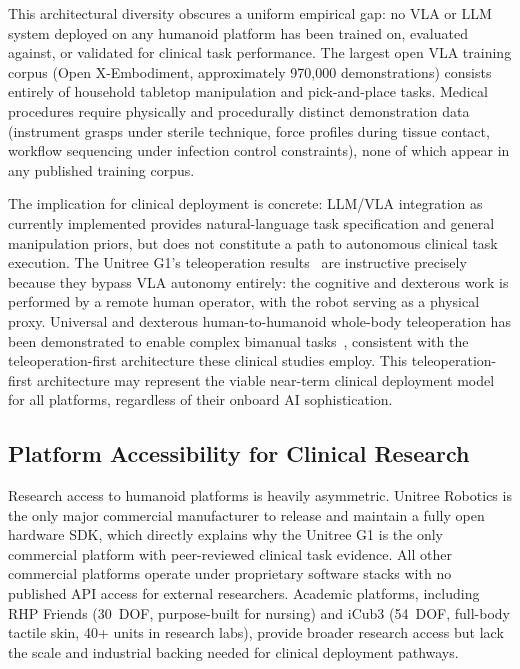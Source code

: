 \documentclass[acmjour]{acmart}
\begin{document}
This architectural diversity obscures a uniform empirical gap: no VLA or LLM
system deployed on any humanoid platform has been trained on, evaluated against,
or validated for clinical task performance. The largest open VLA training corpus
(Open X-Embodiment, approximately 970,000 demonstrations) consists entirely of
household tabletop manipulation and pick-and-place tasks. Medical procedures
require physically and procedurally distinct demonstration data (instrument
grasps under sterile technique, force profiles during tissue contact, workflow
sequencing under infection control constraints), none of which appear in any
published training corpus.

The implication for clinical deployment is concrete: LLM/VLA integration as
currently implemented provides natural-language task specification and general
manipulation priors, but does not constitute a path to autonomous clinical task
execution. The Unitree G1's teleoperation results~\cite{atar2025humanoids,cho2026humanoid}
are instructive precisely because they bypass VLA autonomy entirely: the
cognitive and dexterous work is performed by a remote human operator, with the
robot serving as a physical proxy. Universal and dexterous human-to-humanoid
whole-body teleoperation has been demonstrated to enable complex bimanual
tasks~\cite{he2024omnikh}, consistent with the teleoperation-first architecture
these clinical studies employ. This teleoperation-first architecture may
represent the viable near-term clinical deployment model for all platforms,
regardless of their onboard AI sophistication.

\subsection{Platform Accessibility for Clinical Research}
\label{sec:accessibility}

Research access to humanoid platforms is heavily asymmetric. Unitree Robotics
is the only major commercial manufacturer to release and maintain a fully open
hardware SDK, which directly explains why the Unitree G1 is the only commercial
platform with peer-reviewed clinical task evidence. All other commercial platforms
operate under proprietary software stacks with no published API access for
external researchers. Academic platforms, including RHP Friends (30~DOF, purpose-built
for nursing) and iCub3 (54~DOF, full-body tactile skin, 40+ units in research
labs), provide broader research access but lack the scale and industrial backing
needed for clinical deployment pathways.
\end{document}
